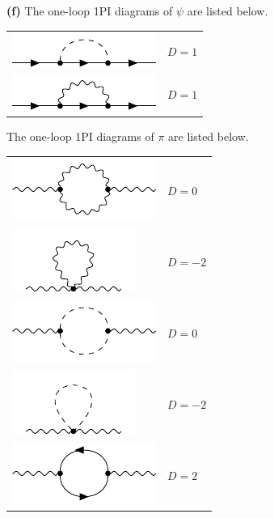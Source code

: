 \documentclass{article}
\makeatletter
\newcommand*{\shifttext}[1]{%
  \settowidth{\@tempdima}{#1}%
  \hspace{-\@tempdima}#1%
}
\newcommand{\plabel}[1]{%
\shifttext{\textbf{#1}\quad}%
}
\makeatother
\begin{document}
\plabel{(f)}%
The one-loop 1PI diagrams of $\psi$ are listed below.
\begin{center}
    \begin{tabular}{m{4cm} m{3cm}}
        \centering
            \includegraphics{img/yukawa/1pi/psi-sigma/psi-sigma.pdf}
         & $D=1$ \\
        \centering
            \includegraphics{img/yukawa/1pi/psi-pi/psi-pi.pdf}
         & $D=1$
    \end{tabular}
\end{center}
The one-loop 1PI diagrams of $\pi$ are listed below.
\begin{center}
    \begin{tabular}{m{4cm} m{3cm}}
        \centering
            \includegraphics{img/yukawa/1pi/pi-pi/pi-pi.pdf}
         & $D=0$ \\
        \centering
            \includegraphics{img/yukawa/1pi/pi-pi/pi2-pi.pdf}
         & $D=-2$ \\
         \centering
            \includegraphics{img/yukawa/1pi/pi-sigma/pi-sigma.pdf}
         & $D=0$ \\
         \centering
            \includegraphics{img/yukawa/1pi/pi-sigma/pi2-sigma.pdf}
         & $D=-2$ \\
         \centering
            \includegraphics{img/yukawa/1pi/pi-psi/pi-psi.pdf}
         & $D=2$
    \end{tabular}
\end{center}
\end{document}
